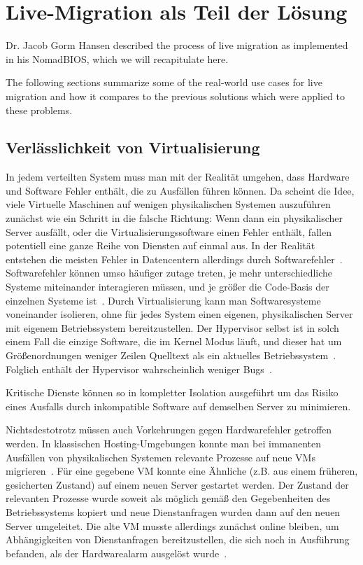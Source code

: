 \documentclass[draft,journal]{IEEEtran}
\begin{document}
\section{Live-Migration als Teil der Lösung}
\label{sec:livemigration}
Dr. Jacob Gorm Hansen described the process of live migration
as implemented in his NomadBIOS, which we will recapitulate here.

The following sections summarize some of the real-world use cases for
live migration and how it compares to the previous solutions which
were applied to these problems.

\subsection{Verlässlichkeit von Virtualisierung}
In jedem verteilten System muss man mit der Realität umgehen, dass
Hardware und Software Fehler enthält, die zu Ausfällen führen
können. Da scheint die Idee, viele Virtuelle Maschinen auf wenigen
physikalischen Systemen auszuführen zunächst wie ein Schritt in die
falsche Richtung: Wenn dann ein physikalischer Server ausfällt, oder
die Virtualisierungssoftware einen Fehler enthält, fallen potentiell
eine ganze Reihe von Diensten auf einmal aus. In der Realität
entstehen die meisten Fehler in Datencentern allerdings durch
Softwarefehler~\cite{tanenbaum1992modern}. Softwarefehler können umso
häufiger zutage treten, je mehr unterschiedliche Systeme miteinander
interagieren müssen, und je größer die Code-Basis der einzelnen
Systeme ist~\cite{zellerprograms}. Durch Virtualisierung kann man
Softwaresysteme voneinander isolieren, ohne für jedes System einen
eigenen, physikalischen Server mit eigenem Betriebssystem
bereitzustellen. Der Hypervisor selbst ist in solch einem Fall die
einzige Software, die im Kernel Modus läuft, und dieser hat um
Größenordnungen weniger Zeilen Quelltext als ein aktuelles
Betriebssystem~\cite{tanenbaum1992modern}. Folglich enthält der
Hypervisor wahrscheinlich weniger Bugs~\cite{zellerprograms}.

Kritische Dienste können so in kompletter Isolation ausgeführt um das
Risiko eines Ausfalls durch inkompatible Software auf demselben Server
zu minimieren.

Nichtsdestotrotz müssen auch Vorkehrungen gegen Hardwarefehler
getroffen werden. In klassischen Hosting-Umgebungen konnte man bei
immanenten Ausfällen von physikalischen Systemen relevante Prozesse
auf neue VMs migrieren~\cite{hansen2004self}. Für eine gegebene VM
konnte eine Ähnliche (z.B. aus einem früheren, gesicherten Zustand)
auf einem neuen Server gestartet werden. Der Zustand der relevanten
Prozesse wurde soweit als möglich gemäß den Gegebenheiten des
Betriebssystems kopiert und neue Dienstanfragen wurden dann auf den
neuen Server umgeleitet. Die alte VM musste allerdings zunächst online
bleiben, um Abhängigkeiten von Dienstanfragen bereitzustellen, die
sich noch in Ausführung befanden, als der Hardwarealarm ausgelöst
wurde~\cite{clark2005live}.
\end{document}
